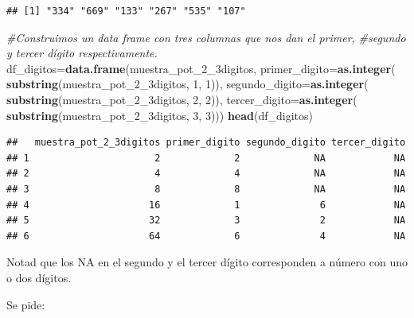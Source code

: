 \documentclass[
]{article}
\newenvironment{Shaded}{\begin{snugshade}}{\end{snugshade}}
\newcommand{\CommentTok}[1]{\textcolor[rgb]{0.56,0.35,0.01}{\textit{#1}}}
\newcommand{\DataTypeTok}[1]{\textcolor[rgb]{0.13,0.29,0.53}{#1}}
\newcommand{\DecValTok}[1]{\textcolor[rgb]{0.00,0.00,0.81}{#1}}
\newcommand{\KeywordTok}[1]{\textcolor[rgb]{0.13,0.29,0.53}{\textbf{#1}}}
\newcommand{\NormalTok}[1]{#1}
\begin{document}
\begin{verbatim}
## [1] "334" "669" "133" "267" "535" "107"
\end{verbatim}

\begin{Shaded}
\begin{Highlighting}[]
\CommentTok{\#Construimos un data frame con tres columnas que nos dan el primer, }
\CommentTok{\#segundo y tercer dígito respectivamente.}
\NormalTok{df\_digitos=}\KeywordTok{data.frame}\NormalTok{(muestra\_pot\_}\DecValTok{2}\NormalTok{\_3digitos,}
                      \DataTypeTok{primer\_digito=}\KeywordTok{as.integer}\NormalTok{(}
                        \KeywordTok{substring}\NormalTok{(muestra\_pot\_}\DecValTok{2}\NormalTok{\_3digitos, }\DecValTok{1}\NormalTok{, }\DecValTok{1}\NormalTok{)),}
                      \DataTypeTok{segundo\_digito=}\KeywordTok{as.integer}\NormalTok{(}
                        \KeywordTok{substring}\NormalTok{(muestra\_pot\_}\DecValTok{2}\NormalTok{\_3digitos, }\DecValTok{2}\NormalTok{, }\DecValTok{2}\NormalTok{)),}
                      \DataTypeTok{tercer\_digito=}\KeywordTok{as.integer}\NormalTok{(}
                        \KeywordTok{substring}\NormalTok{(muestra\_pot\_}\DecValTok{2}\NormalTok{\_3digitos, }\DecValTok{3}\NormalTok{, }\DecValTok{3}\NormalTok{)))}
\KeywordTok{head}\NormalTok{(df\_digitos)}
\end{Highlighting}
\end{Shaded}

\begin{verbatim}
##   muestra_pot_2_3digitos primer_digito segundo_digito tercer_digito
## 1                      2             2             NA            NA
## 2                      4             4             NA            NA
## 3                      8             8             NA            NA
## 4                     16             1              6            NA
## 5                     32             3              2            NA
## 6                     64             6              4            NA
\end{verbatim}

Notad que los NA en el segundo y el tercer dígito corresponden a número
con uno o dos dígitos.

Se pide:
\end{document}
